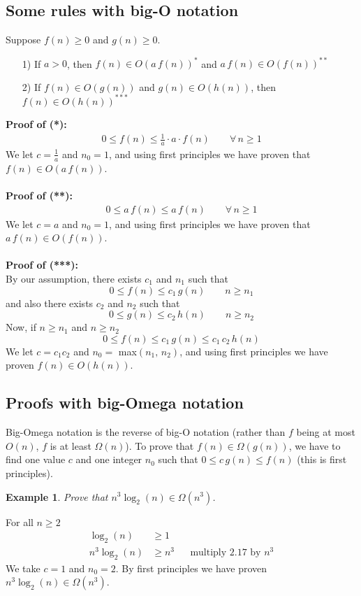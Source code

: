 \documentclass{report}
\newtheorem{ex}{Example}[section]
\begin{document}
\subsection{Some rules with big-O notation}
\noindent Suppose $f(n) \geq 0$ and $g(n) \geq 0$.
\begin{itemize}
\item[1)] If $a > 0$, then $f(n) \in O(a\, f(n))^*$ and $a \, f(n) \in O(f(n))^{**}$
\item[2)] If $f(n) \in O(g(n))$ and $g(n) \in O(h(n))$, then $f(n) \in O(h(n))^{***}$
\end{itemize}
\textbf{Proof of (*):}
\begin{align}
0 \leq f(n) \leq \frac{1}{a} \cdot a \cdot f(n) \qquad \forall\, n \geq 1
\end{align}
We let $c = \frac{1}{a}$ and $n_0 = 1$, and using first principles we have proven that $f(n) \in O(a\, f(n))$.\\\\
\textbf{Proof of (**):}
\begin{align}
0 \leq a\, f(n) \leq a \, f(n) \qquad \forall\, n \geq 1
\end{align}
We let $c = a$ and $n_0 = 1$, and using first principles we have proven that $a\, f(n) \in O(f(n))$.\\\\
\textbf{Proof of (***):}\\
By our assumption, there exists $c_1$ and $n_1$ such that
\begin{equation}
0 \leq f(n) \leq c_1 \, g(n) \qquad n \geq n_1
\end{equation}
and also there exists $c_2$ and $n_2$ such that
\begin{equation}
0 \leq g(n) \leq c_2 \, h(n) \qquad n \geq n_2
\end{equation}
Now, if $n \geq n_1$ and $n \geq n_2$
\begin{equation}
0 \leq f(n) \leq c_1 \, g(n) \leq c_1\,c_2\,h(n)
\end{equation}
We let $c = c_1c_2$ and $n_0 =$ max$(n_1,\,n_2)$, and using first principles we have proven $f(n) \in O(h(n))$.

\subsection{Proofs with big-Omega notation}
Big-Omega notation is the reverse of big-O notation (rather than $f$ being at most $O(n)$, $f$ is at least $\Omega(n)$). To prove that $f(n) \in \Omega(g(n))$, we have to find one value $c$ and one integer $n_0$ such that $0 \leq c \, g(n) \leq f(n)$ (this is first principles).
\begin{ex}
Prove that $n^3 \log_2(n) \in \Omega(n^3)$.
\end{ex}
\noindent For all $n \geq 2$
\begin{align}
\log_2(n) &\geq 1 \\
n^3 \log_2(n) &\geq n^3 && \text{multiply 2.17 by }n^3
\end{align}
We take $c=1$ and $n_0 = 2$. By first principles we have proven $n^3 \log_2(n) \in \Omega(n^3)$.
\end{document}
